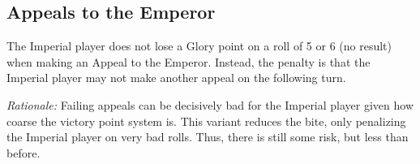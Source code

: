 \subsection{Appeals to the Emperor}

The Imperial player does not lose a Glory point on a roll of 5 or 6 (no result) when making an Appeal to the Emperor. Instead, the penalty is that the Imperial player may not make another appeal on the following turn.

\textit{Rationale:} Failing appeals can be decisively bad for the Imperial player given how coarse the victory point system is. This variant reduces the bite, only penalizing the Imperial player on very bad rolls. Thus, there is still some risk, but less than before.